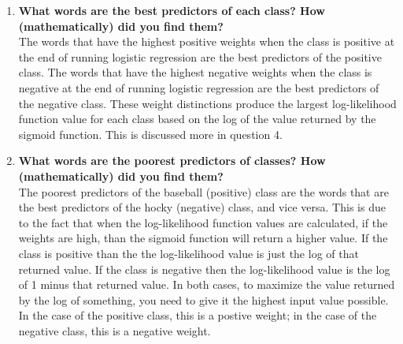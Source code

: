 \documentclass[8pt]{article}
\begin{document}
\begin{enumerate}
\item \textbf{What words are the best predictors of each class? How (mathematically) did you find them?}\\
The words that have the highest positive weights when the class is positive at the end of running logistic regression are the best predictors of the positive class.  The words that have the highest negative weights when the class is negative at the end of running logistic regression are the best predictors of the negative class.  These weight distinctions produce the largest log-likelihood function value for each class based on the log of the value returned by the sigmoid function.  This is discussed more in question 4.
\begin{figure}[H]
\centering
{}
\hspace{1cm}
\end{figure}
\item \textbf{What words are the poorest predictors of classes? How (mathematically) did you find them?}\\
The poorest predictors of the baseball (positive) class are the words that are the best predictors of the hocky (negative) class, and vice versa.  This is due to the fact that when the log-likelihood function values are calculated, if the weights are high, than the sigmoid function will return a higher value.  If the class is positive than the the log-likelihood value is just the log of that returned value. If the class is negative then the log-likelihood value is the log of 1 minus that returned value.  In both cases, to maximize the value returned by the log of something, you need to give it the highest input value possible.  In the case of the positive class, this is a postive weight; in the case of the negative class, this is a negative weight.

\end{enumerate}
\end{document}
